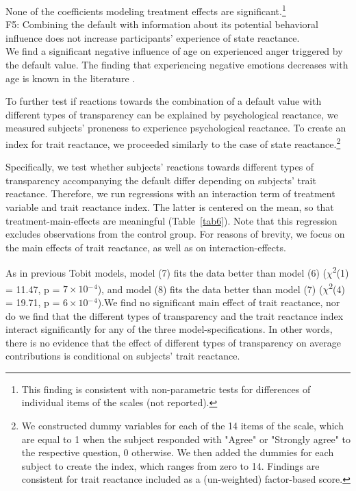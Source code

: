 \documentclass[review, authoryear,12pt]{elsarticle}
\begin{document}
None of the coefficients modeling treatment effects are significant.\footnote{This finding is consistent with non-parametric tests for differences of individual items of the scales (not reported).} \\

F5: Combining the default with information about its potential behavioral influence does not increase participants' experience of state reactance. \\

We find a significant negative influence of age on experienced anger triggered by the default value. The finding that experiencing negative emotions decreases with age is known in the literature \citep[e.g.][]{Charles.2001}.

To further test if reactions towards the combination of a default value with different types of transparency can be explained by psychological reactance, we measured subjects' proneness to experience psychological reactance. To create an index for trait reactance, we proceeded similarly to the case of state reactance.\footnote{We constructed dummy variables for each of the 14 items of the scale, which are equal to 1 when the subject responded with "Agree" or "Strongly agree" to the respective question, 0 otherwise. We then added the dummies for each subject to create the index, which ranges from zero to 14. Findings are consistent for trait reactance included as a (un-weighted) factor-based score.}

Specifically, we test whether subjects' reactions towards different types of transparency accompanying the default differ depending on subjects' trait reactance. Therefore, we run regressions with an interaction term of treatment variable and trait reactance index. The latter is centered on the mean, so that treatment-main-effects are meaningful (Table~\ref{tab6}). Note that this regression excludes observations from the control group. For reasons of brevity, we focus on the main effects of trait reactance, as well as on interaction-effects.

As in previous Tobit models, model (7) fits the data better than model (6) ($\chi$\textsuperscript{2}(1) = 11.47, p = $7\times 10$$^-$$^4$), and model (8) fits the data better than model (7) ($\chi$\textsuperscript{2}(4) = 19.71, p = $6\times 10$$^-$$^4$).We find no significant main effect of trait reactance, nor do we find that the different types of transparency and the trait reactance index interact significantly for any of the three model-specifications. In other words, there is no evidence that the effect of different types of transparency on average contributions is conditional on subjects' trait reactance. \\
\end{document}
